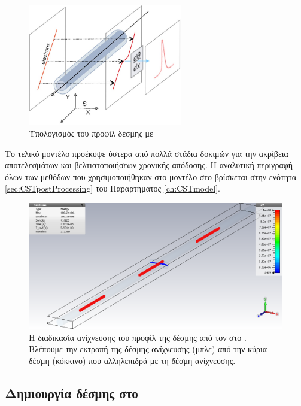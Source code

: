 \begin{figure}[tph]
\includegraphics[width=0.6\textwidth]{figures/EBS-profile-calculation}
\centering
\caption{Υπολογισμός του προφίλ δέσμης με }
\label{fig:EBS-profile-calculation}
\end{figure}

Το τελικό μοντέλο προέκυψε ύστερα από πολλά στάδια δοκιμών για την ακρίβεια αποτελεσμάτων και βελτιστοποιήσεων χρονικής απόδοσης.
Η αναλυτική περιγραφή όλων των μεθόδων  που χρησιμοποιήθηκαν στο μοντέλο στο  βρίσκεται στην ενότητα \ref{sec:CSTpostProcessing} του Παραρτήματος \ref{ch:CSTmodel}.

\begin{figure}[tbh]
\includegraphics[width=\textwidth]{figures/CST-multi-bunch-EBS-detection.png}
\centering
\caption[Η διαδικασία ανίχνευσης του προφίλ της δέσμης από τον  στο ]
{Η διαδικασία ανίχνευσης του προφίλ της δέσμης από τον  στο .
Βλέπουμε την εκτροπή της δέσμης ανίχνευσης (μπλε) από την κύρια δέσμη (κόκκινο) που αλληλεπιδρά με τη δέσμη ανίχνευσης.}
\label{fig:CST-MultiBunchEBSDetection}
\end{figure}

\subsection{Δημιουργία  δέσμης στο }

